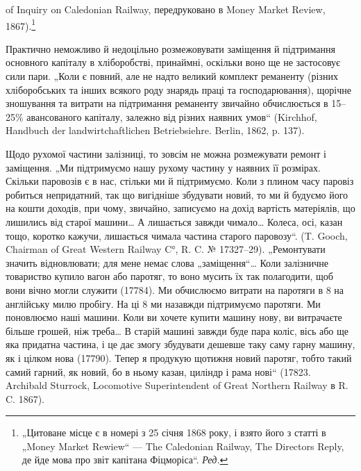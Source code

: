 \parcont{}  %
of Inquiry on Caledonian Railway, передруковано в Money Market Review, 1867).\footnote*{
„Цитоване місце є в номері з 25 січня 1868 року, і взято його з статті
в „Money Market Rewiew“ — The Caledonian Railway, The Directors Reply, де йде мова про звіт капітана Фіцморіса“. \emph{Ред.}
}

Практично неможливо й недоцільно розмежовувати заміщення й підтримання основного капіталу в
хліборобстві, принаймні, оскільки воно ще не застосовує сили пари. „Коли є повний, але не надто
великий комплект реманенту (різних хліборобських та інших всякого роду знарядь праці та
господарювання), щорічне зношування та витрати на підтримання реманенту звичайно обчислюється в
15--25\% авансованого капіталу, залежно від різних наявних умов“ (Kirchhof, Handbuch der
landwirtchaftlichen Betriebsiehre. Berlin, 1862, p. 137).

Щодо рухомої частини залізниці, то зовсім не можна розмежувати ремонт і заміщення. „Ми підтримуємо
нашу рухому частину у наявних її розмірах. Скільки паровозів є в нас, стільки ми й підтримуємо. Коли
з плином часу паровіз робиться непридатний, так що вигідніше збудувати новий, то ми й будуємо його
на кошти доходів, при чому, звичайно, записуємо на дохід вартість матеріялів, що лишились від старої
машини\dots{} А лишається завжди чимало\dots{} Колеса, осі, казан тощо, коротко кажучи, лишається чимала частина
старого паровозу“. (T. Gooch, Chairman of Great Western Railway C°, R. C. № 17327--29). „Ремонтувати
значить відновлювати; для мене немає слова „заміщення“\dots{} Коли залізничне товариство купило вагон
або паротяг, то воно мусить їх так полагодити, щоб вони вічно могли служити (17784). Ми обчислюємо
витрати на паротяги в 8 на англійську милю пробігу. На ці 8 ми назавжди
підтримуємо паротяги. Ми поновлюємо наші машини. Коли ви хочете купити машину нову, ви витрачаєте
більше грошей, ніж треба\dots{} В старій машині завжди буде пара коліс, вісь або ще яка придатна
частина, і це дає змогу збудувати дешевше таку саму гарну машину, як і цілком нова (17790). Тепер я
продукую щотижня новий паротяг, тобто такий самий гарний, як новий, бо в ньому казан, циліндр і рама
нові“ (17823. Archibald Sturrock, Locomotive Superintendent of Great Northern Railway в R. C. 1867).

